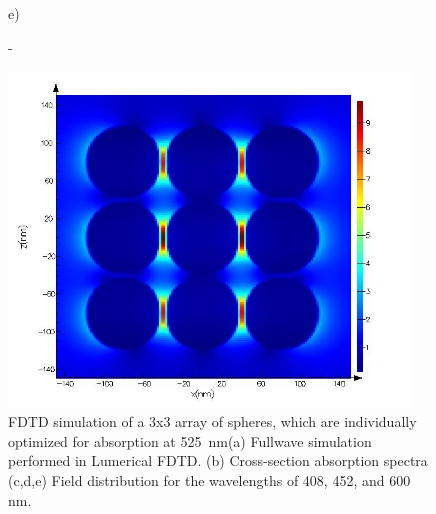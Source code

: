 \documentclass[a4paper]{article}
\begin{document}
\begin{figure}
\begin{minipage}[h]{0.49\textwidth}
  \end{minipage}
  \begin{minipage}[h]{0.49\textwidth}    \begin{flushleft}     e)    \end{flushleft}
  \end{minipage}
  \begin{minipage}[h]{0.49\textwidth}    \begin{flushleft}     -   \end{flushleft}
  \end{minipage}
  \begin{minipage}[h]{0.49\textwidth} 
    \includegraphics[width=0.95\textwidth]{fdtd-field-600nm}
  \end{minipage}
  
    \caption{ FDTD simulation of a 3x3 array of spheres, which are individually optimized for
      absorption at 525~nm(a) Fullwave simulation performed in Lumerical FDTD. (b) Cross-section absorption spectra (c,d,e)
      Field distribution for the wavelengths of 408, 452, and 600 nm.\label{fig:fdtd-3x3}}%
\end{figure}


\vspace{10pt}
\end{document}
